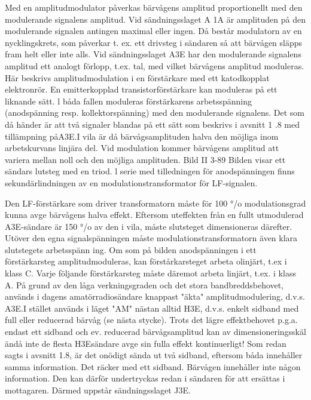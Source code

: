 Med en amplitudmodulator påverkas bärvågens amplitud proportionellt med den modulerande signalens amplitud.
Vid sändningsslaget A 1A är amplituden
på den modulerande signalen antingen maximal eller ingen. Då består modulatorn av en
nycklingskrets, som påverkar t. ex. ett drivsteg i sändaren så att bärvågen släpps fram
helt eller inte alls.
Vid sändningsslaget A3E har den modulerande signalens amplitud ett analogt förlopp, t.ex. tal, med vilket bärvågens amplitud moduleras. Här beskrivs amplitudmodulation i en förstärkare med ett katodkopplat
elektronrör. En emitterkopplad transistorförstärkare kan moduleras på ett liknande
sätt. l båda fallen moduleras förstärkarens
arbetsspänning (anodspänning resp. kollektorspänning) med den modulerande signalens. Det som då händer är att två signaler
blandas på ett sätt som beskrivs i avsnitt 1 .8
med tillämpning påA3E.I vila är då bärvågsamplituden halva den möjliga inom arbetskurvans linjära del. Vid modulation kommer
bärvågens amplitud att variera mellan noll
och den möjliga amplituden.
Bild II 3-89
Bilden visar ett sändars lutsteg med en triod.
l serie med tilledningen för anodspänningen
finns sekundärlindningen av en modulationstransformator för LF-signalen.

Den LF-förstärkare som driver transformatorn måste för 100 °/o modulationsgrad
kunna avge bärvågens halva effekt. Eftersom uteffekten från en fullt utmodulerad
A3E-sändare är 150 °/o av den i vila, måste
slutsteget dimensioneras därefter. Utöver
den egna signalspänningen måste modulationstransformatorn även klara slutstegets
arbetsspänn ing.
Om som på bilden anodspänningen i ett
förstärkarsteg amplitudmoduleras, kan förstårkarsteget arbeta olinjärt, t.ex i klass C.
Varje följande förstärkarsteg måste däremot
arbeta linjärt, t.ex. i klass A.
På grund av den låga verkningsgraden
och det stora bandbreddsbehovet, används
i dagens amatörradiosändare knappast
"äkta" amplitudmodulering, d.v.s. A3E.I stället används i läget "AM" nästan alltid H3E,
d.v.s. enkelt sidband med full eller reducerad bärvåg (se nästa stycke). Trots det lägre
effektbehovet p.g.a. endast ett sidband och
ev. reducerad bärvågsamplitud kan av dimensioneringsskäl ändå inte de flesta H3Esändare avge sin fulla effekt kontinuerligt!
Som redan sagts i avsnitt 1.8, är det onödigt
sända ut två sidband, eftersom båda innehåller samma information. Det räcker med
ett sidband. Bärvågen innehåller inte någon
information. Den kan därför undertryckas
redan i sändaren för att ersättas i mottagaren. Därmed uppstår sändningsslaget J3E.


